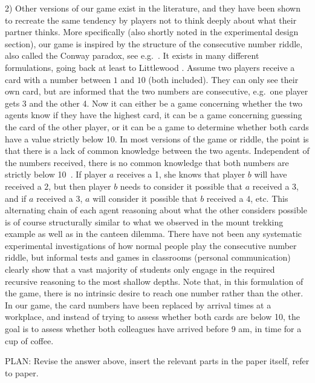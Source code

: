 \documentclass[a4paper]{article}
\newenvironment{robin}{\smallskip \noindent \color{red!10!green!50!blue}}{\color{black}\smallskip}
\begin{document}
\begin{itemize}
\begin{robin}
2) Other versions of our game exist in the literature, and they have been shown to recreate the same tendency by players not to think deeply about what their partner thinks. More specifically (also shortly noted in the experimental design section), our game is inspired by the structure of the consecutive number riddle, also called the Conway paradox, see e.g.~\cite{van1980conway, van2015one}. It exists in many different formulations, going back at least to Littlewood \cite{littlewood1953mathematician}. Assume two players receive a card with a number between $1$ and $10$ (both included). They can only see their own card, but are informed that the two numbers are consecutive, e.g.\ one player gets 3 and the other 4. Now it can either be a game concerning whether the two agents know if they have the highest card, it can be a game concerning guessing the card of the other player, or it can be a game to determine whether both cards have a value strictly below 10. In most versions of the game or riddle, the point is that there is a lack of common knowledge between the two agents. Independent of the numbers received, there is no common knowledge that both numbers are strictly below 10~\cite{ditmarsch2008dynamic}. If player $a$ receives a 1, she knows that player $b$ will have received a $2$, but then player $b$ needs to consider it possible that $a$ received a $3$, and if $a$ received a $3$, $a$ will consider it possible that $b$ received a $4$, etc. This alternating chain of each agent reasoning about what the other considers possible is of course structurally similar to what we observed in the mount trekking example as well as in the canteen dilemma. There have not been any systematic experimental investigations of how normal people play the consecutive number riddle, but informal tests and games in classrooms (personal communication) clearly show that a vast majority of students only engage in the required recursive reasoning to the most shallow depths. Note that, in this formulation of the game, there is no intrinsic desire to reach one number rather than the other. In our game, the card numbers have been replaced by arrival times at a workplace, and instead of trying to assess whether both cards are below 10, the goal is to assess whether both colleagues have arrived before 9 am, in time for a cup of coffee.

PLAN: Revise the answer above, insert the relevant parts in the paper itself, refer to paper. 
\end{robin}


\end{itemize}
\end{document}
